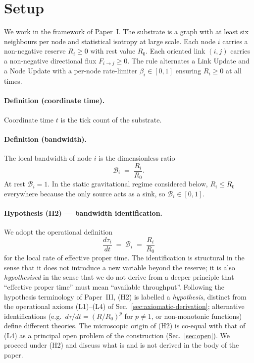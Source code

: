\documentclass[11pt,a4paper]{article}
\begin{document}
\section{Setup}
\label{sec:setup}

We work in the framework of Paper~I. The substrate is a graph
with at least six neighbours per node and statistical isotropy
at large scale. Each node $i$ carries a non-negative reserve
$R_i \ge 0$ with rest value $R_0$. Each oriented link $(i, j)$
carries a non-negative directional flux $F_{i \to j} \ge 0$.
The rule alternates a Link Update and a Node Update with a
per-node rate-limiter $\beta_i \in [0, 1]$ ensuring
$R_i \ge 0$ at all times.

\paragraph{Definition (coordinate time).} Coordinate time $t$
is the tick count of the substrate.

\paragraph{Definition (bandwidth).} The local bandwidth of
node $i$ is the dimensionless ratio
\begin{equation}
\mathcal{B}_i \;=\; \frac{R_i}{R_0}.
\label{eq:bandwidth}
\end{equation}
At rest $\mathcal{B}_i = 1$. In the static gravitational
regime considered below, $R_i \le R_0$ everywhere because the
only source acts as a sink, so $\mathcal{B}_i \in [0, 1]$.

\paragraph{Hypothesis (H2) --- bandwidth identification.}
We adopt the operational definition
\begin{equation}
\frac{d\tau_i}{dt} \;=\; \mathcal{B}_i \;=\; \frac{R_i}{R_0}
\label{eq:tau_def}
\end{equation}
for the local rate of effective proper time. The
identification is structural in the sense that it does not
introduce a new variable beyond the reserve; it is also
\emph{hypothesised} in the sense that we do not derive from a
deeper principle that ``effective proper time'' must mean
``available throughput''. Following the hypothesis terminology
of Paper~III, (H2) is labelled a \emph{hypothesis}, distinct
from the operational axioms (L1)--(L4) of
Sec.~\ref{sec:axiomatic-derivation}; alternative
identifications (e.g.\ $d\tau/dt = (R/R_0)^p$ for $p \ne 1$,
or non-monotonic functions) define different theories. The
microscopic origin of (H2) is co-equal with that of (L4) as a
principal open problem of the construction
(Sec.~\ref{sec:open}). We proceed under (H2) and discuss what
is and is not derived in the body of the paper.
\end{document}
